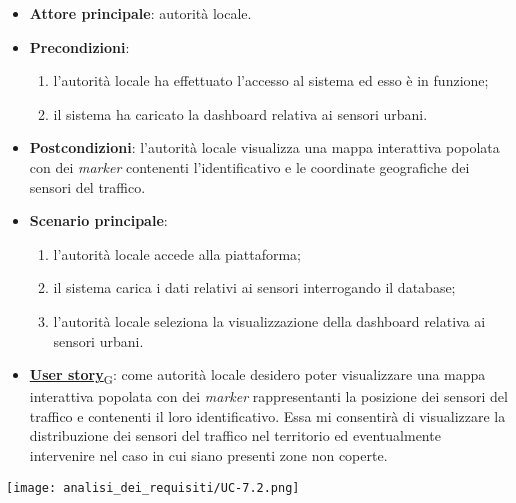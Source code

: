 \begin{itemize}
	\item \textbf{Attore principale}: autorità locale.
	\item \textbf{Precondizioni}:
	      \begin{enumerate}
		      \item l'autorità locale ha effettuato l'accesso al sistema ed esso è in funzione;
		      \item il sistema ha caricato la dashboard relativa ai sensori urbani.
	      \end{enumerate}
	\item \textbf{Postcondizioni}: l'autorità locale visualizza una mappa interattiva popolata con dei \textit{marker} contenenti l'identificativo e le coordinate geografiche dei sensori del traffico.
	\item \textbf{Scenario principale}:
	      \begin{enumerate}
		      \item l'autorità locale accede alla piattaforma;
		      \item il sistema carica i dati relativi ai sensori interrogando il database;
		      \item l'autorità locale seleziona la visualizzazione della dashboard relativa ai sensori urbani.
	      \end{enumerate}
	\item \href{https://7last.github.io/docs/pb/documentazione-interna/glossario\#user-story}{\textbf{User story}\textsubscript{G}}:
	      come autorità locale desidero poter visualizzare una mappa interattiva popolata con dei \textit{marker} rappresentanti la posizione dei sensori del traffico
	      e contenenti il loro identificativo. Essa mi consentirà di visualizzare la distribuzione dei sensori del traffico nel territorio ed eventualmente intervenire nel caso in cui siano presenti zone non coperte.
\end{itemize}
\begin{center}
	\texttt{[image: analisi\_dei\_requisiti/UC-7.2.png]}
\end{center}



